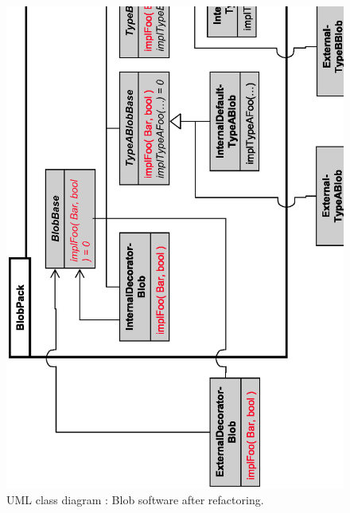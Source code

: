 \documentclass[pdf,ps2pdf,11pt]{SANDreport}
\begin{document}
{\bsinglespace
\begin{figure}[p]
\begin{center}
\includegraphics*[scale=0.75
]{BlobBaseAfterRefactoring}
\end{center}
\caption{
\label{fig:BlobBaseAfterRefactoring}
UML class diagram : Blob software after refactoring.  }
\end{figure}
\esinglespace}
\end{document}
